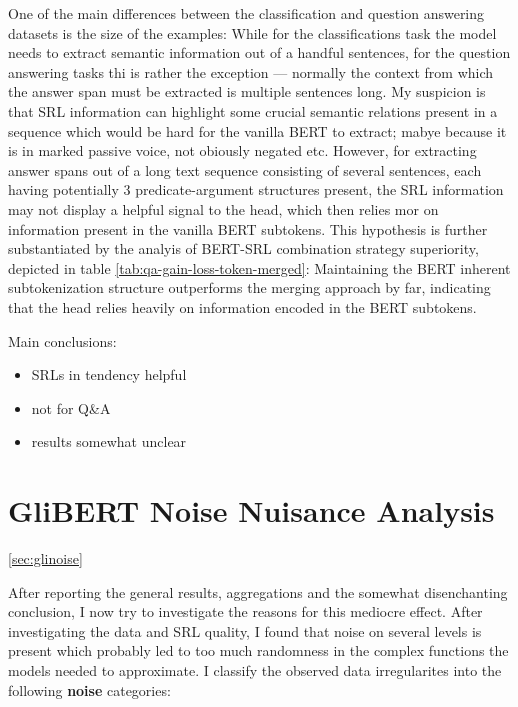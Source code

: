 One of the main differences between the classification and question answering datasets is the size of
the examples: While for the classifications task the model needs to extract semantic
information out of a handful sentences, for the question answering tasks thi is rather the exception ---
normally the context from which the answer span must be extracted is multiple sentences long. My suspicion
is that SRL information can highlight some crucial semantic relations present in a sequence which would be
hard for the vanilla BERT to extract; mabye because it is in marked passive voice, not obiously negated etc.
However, for extracting answer spans out of a long text sequence consisting of several sentences, each having
potentially 3 predicate-argument structures present, the SRL information may not display a helpful signal to the
head, which then relies mor on information present in the vanilla BERT subtokens. This hypothesis is further
substantiated by the analyis of BERT-SRL combination strategy superiority, depicted in table \ref{tab:qa-gain-loss-token-merged}:
Maintaining the BERT inherent subtokenization structure outperforms the merging approach by far, indicating that
the head relies heavily on information encoded in the BERT subtokens.






Main conclusions:

\begin{itemize}
  \item SRLs in tendency helpful
  \item not for Q\&A
  \item results somewhat unclear
\end{itemize}


\section{GliBERT Noise Nuisance Analysis}
\ref{sec:glinoise}


After reporting the general results, aggregations and the somewhat disenchanting conclusion, I
now try to investigate the reasons for this mediocre effect. After investigating the data and
SRL quality, I found that noise on several levels is present which probably led to too much
randomness in the complex functions the models needed to approximate. I classify the observed
data irregularites into the following \textbf{noise} categories:


